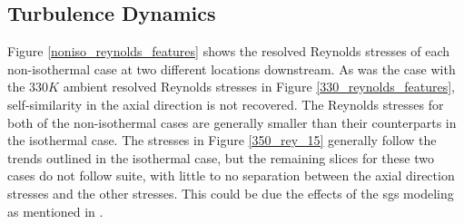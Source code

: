 \subsection{Turbulence Dynamics}
Figure \ref{noniso_reynolds_features} shows the resolved Reynolds stresses of each non-isothermal case at two different locations downstream. As was the case with the $330 K$ ambient resolved Reynolds stresses in Figure \ref{330_reynolds_features}, self-similarity in the axial direction is not recovered. The Reynolds stresses for both of the non-isothermal cases are generally smaller than their counterparts in the isothermal case. The stresses in Figure \ref{350_rey_15} generally follow the trends outlined in the isothermal case, but the remaining slices for these two cases do not follow suite, with little to no separation between the axial direction stresses and the other stresses. This could be due the effects of the \gls{sgs} modeling as mentioned in \cite{doi:10.1063/1.4937948}.  
